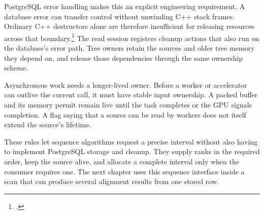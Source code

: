 PostgreSQL error handling makes this an explicit engineering requirement.
A database error can transfer control without unwinding C++ stack frames.
Ordinary C++ destructors alone are therefore insufficient for releasing
resources across that boundary.\footcite{postgresql17_cpp_extensibility}
The read session registers cleanup actions that also run on the database's
error path. Tree owners retain the sources and older tree memory they depend
on, and release those dependencies through the same ownership scheme.

Asynchronous work needs a longer-lived owner. Before a worker or accelerator
can outlive the current call, it must have stable input ownership. A packed
buffer and its memory permit remain live until the task completes or the GPU
signals completion. A flag saying that a source can be read by workers does
not itself extend the source's lifetime.

These rules let sequence algorithms request a precise interval without also
having to implement PostgreSQL storage and cleanup. They supply ranks in the
required order, keep the source alive, and allocate a complete interval only
when the consumer requires one. The next chapter uses this sequence interface
inside a scan that can produce several alignment results from one stored row.
\flushbottom
